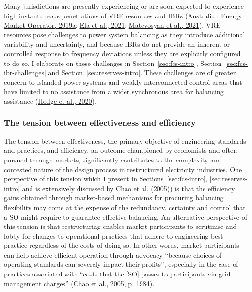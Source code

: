 \documentclass[12pt,a4paper,]{report}
\begin{document}
Many jurisdictions are presently experiencing or are soon expected to
experience high instantaneous penetrations of VRE resources and IBRs
(\protect\hyperlink{ref-australianenergymarketoperatorMaintainingPowerSystem2019}{Australian
Energy Market Operator, 2019a};
\protect\hyperlink{ref-elaElectricityMarketFuture2021}{Ela et al.,
2021};
\protect\hyperlink{ref-matevosyanFutureInverterBasedResources2021}{Matevosyan
et al., 2021}). VRE resources pose challenges to power system balancing
as they introduce additional variability and uncertainty, and because
IBRs do not provide an inherent or controlled response to frequency
deviations unless they are explicitly configured to do so. I elaborate
on these challenges in Section~\ref{sec:fcs-intro},
Section~\ref{sec:fcs-ibr-challenges} and
Section~\ref{sec:reserves-intro}. These challenges are of greater
concern to islanded power systems and weakly-interconnected control
areas that have limited to no assistance from a wider synchronous area
for balancing assistance
(\protect\hyperlink{ref-hodgeAddressingTechnicalChallenges2020}{Hodge et
al., 2020}).

\hypertarget{the-tension-between-effectiveness-and-efficiency}{%
\subsubsection{The tension between effectiveness and
efficiency}\label{the-tension-between-effectiveness-and-efficiency}}

The tension between effectiveness, the primary objective of engineering
standards and practices, and efficiency, an outcome championed by
economists and often pursued through markets, significantly contributes
to the complexity and contested nature of the design process in
restructured electricity industries. One perspective of this tension
which I present in
Sections~\ref{sec:fcs-intro}, \ref{sec:reserves-intro} and is
extensively discussed by Chao et al.
(\protect\hyperlink{ref-chaoInterfaceEngineeringMarket2005}{2005})) is
that the efficiency gains obtained through market-based mechanisms for
procuring balancing flexibility may come at the expense of the
redundancy, certainty and control that a SO might require to guarantee
effective balancing. An alternative perspective of this tension is that
restructuring enables market participants to scrutinise and lobby for
changes to operational practices that adhere to engineering
best-practice regardless of the costs of doing so. In other words,
market participants can help achieve efficient operation through
advocacy ``because choices of operating standards can severely impact
their profits'', especially in the case of practices associated with
``costs that the {[}SO{]} passes to participants via grid management
charges''
(\protect\hyperlink{ref-chaoInterfaceEngineeringMarket2005}{Chao et al.,
2005, p. 1984}).
\end{document}
